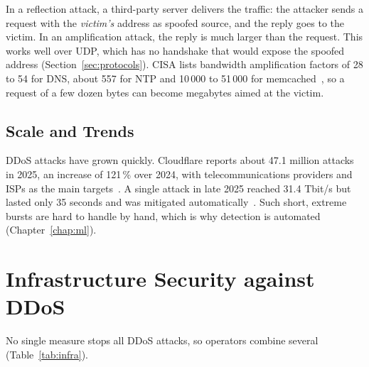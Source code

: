 In a reflection attack, a third-party server delivers the traffic: the attacker sends a request with the \emph{victim's} address as spoofed source, and the reply goes to the victim. In an amplification attack, the reply is much larger than the request. This works well over UDP, which has no handshake that would expose the spoofed address (Section~\ref{sec:protocols}). CISA lists bandwidth amplification factors of 28 to 54 for DNS, about 557 for NTP and 10\,000 to 51\,000 for memcached~\cite{cisa_amp}, so a request of a few dozen bytes can become megabytes aimed at the victim.

\subsection{Scale and Trends}

DDoS attacks have grown quickly. Cloudflare reports about 47.1 million attacks in 2025, an increase of 121\,\% over 2024, with telecommunications providers and ISPs as the main targets~\cite{thn_aisuru,fastnetmon,cyberinsider}. A single attack in late 2025 reached 31.4 Tbit/s but lasted only 35 seconds and was mitigated automatically~\cite{thn_aisuru}. Such short, extreme bursts are hard to handle by hand, which is why detection is automated (Chapter~\ref{chap:ml}).

\section{Infrastructure Security against DDoS}\label{sec:infra}

No single measure stops all DDoS attacks, so operators combine several (Table~\ref{tab:infra}).

